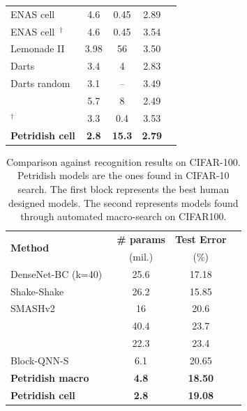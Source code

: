 \documentclass{article}
\newcommand{\Petridish}{Petridish\xspace}
\begin{document}
\begin{table}[t]
\begin{tabular}{l|cccc}
ENAS cell~\citep{Pham2018EfficientNA}
    &  4.6 &  0.45 &  2.89 \\ 
ENAS cell~\citep{Pham2018EfficientNA}$^{\dagger}$
    &  4.6 &  0.45 &  3.54 \\ 
Lemonade II~\citep{Elsken2018EfficientMN}
    &  3.98 &  56 &  3.50 \\
Darts~\citep{Liu2018DARTSDA}
    &  3.4 &   4 &  2.83 \\ 
Darts random~\citep{Liu2018DARTSDA}
    & 3.1 & -- & 3.49 \\
\citet{CaiPathLevel} 
    & 5.7 &  8  & 2.49 \\
\citet{NAONet}$^{\dagger}$
    & 3.3 & 0.4 & 3.53 \\
\hline
\textbf{\Petridish cell}
    & \textbf{2.8} & \textbf{15.3} & \textbf{2.79} \\
\hline
    \end{tabular}
    \label{tab:cifar10_search}
\end{table}



\begin{table}[t]
    \centering
    \caption{Comparison against recognition results on CIFAR-100. \Petridish models are the ones found in CIFAR-10 search. The first block represents the best human designed models. The second represents models found through automated macro-search on CIFAR100. 
    }
    \begin{tabular}{l|ccc}
    \hline
\multirow{ 2}{*}{\textbf{Method} }
        &  \textbf{\# params} 
        &  \textbf{Test Error } \\
        &  (mil.)
        &  (\%)\\
\hline
DenseNet-BC (k=40)~\citep{densenet}
    & 25.6 & 17.18 \\
Shake-Shake~\citep{shakeshake}
    & 26.2 & 15.85 \\
\hline
SMASHv2~\citep{SMASH}
    & 16 & 20.6 \\
\citet{Real2017EvoNet}
    & 40.4 & 23.7 \\
\citet{elskenSimpleNAS}
    & 22.3 & 23.4 \\
Block-QNN-S~\citep{blockqnn}
    & 6.1 & 20.65 \\
\hline
\textbf{\Petridish macro}
    & \textbf{4.8} & \textbf{18.50} \\
\hline
\textbf{\Petridish cell}
    & \textbf{2.8} & \textbf{19.08} \\
\hline
    \end{tabular}
    \label{tab:cifar100_search}
\end{table}
\end{document}
